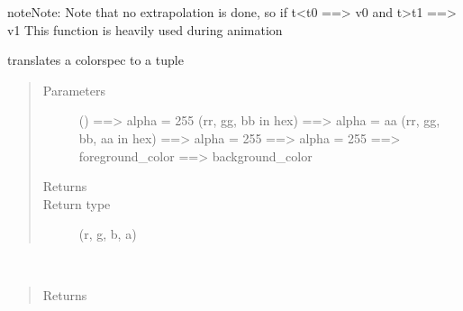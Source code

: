 \documentclass[letterpaper,10pt,english]{sphinxmanual}
\begin{document}
\begin{fulllineitems}
\begin{fulllineitems}
\begin{quote}
\begin{description}
\end{description}\end{quote}

\begin{sphinxadmonition}{note}{Note:}
Note that no extrapolation is done, so if t\textless{}t0 ==\textgreater{} v0  and t\textgreater{}t1 ==\textgreater{} v1 
This function is heavily used during animation
\end{sphinxadmonition}

\end{fulllineitems}


\begin{fulllineitems}
\label{\detokenize{Reference:salabim.Environment.colorspec_to_tuple}}
translates a colorspec to a tuple
\begin{quote}\begin{description}
\item[{Parameters}] \leavevmode
{} (\sphinxstyleliteralemphasis{, }) \textendash{}  ==\textgreater{} alpha = 255 (rr, gg, bb in hex) 
 ==\textgreater{} alpha = aa (rr, gg, bb, aa in hex) 
 ==\textgreater{} alpha = 255 
 ==\textgreater{} alpha = 255 
 ==\textgreater{} foreground\_color 
 ==\textgreater{} background\_color

\item[{Returns}] \leavevmode


\item[{Return type}] \leavevmode
(r, g, b, a)

\end{description}\end{quote}

\end{fulllineitems}


\begin{fulllineitems}
\label{\detokenize{Reference:salabim.Environment.current_component}}~\begin{quote}\begin{description}
\item[{Returns}] \leavevmode
{}


\end{description}
\end{quote}
\end{fulllineitems}
\end{fulllineitems}
\end{document}
